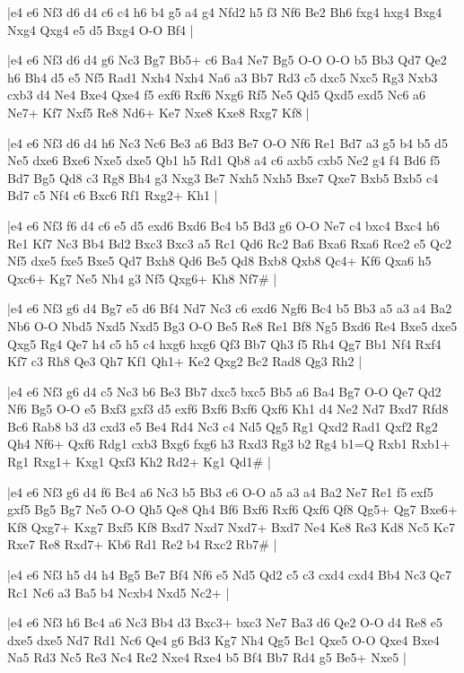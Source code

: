 \whitename{}
\blackname{}
\makegametitle
|e4 e6 Nf3 d6 d4 c6 c4 h6 b4 g5 a4 g4 Nfd2 h5 f3 Nf6 Be2 Bh6 fxg4 hxg4 Bxg4 Nxg4 Qxg4 e5 d5 Bxg4 O-O Bf4  |

\whitename{}
\blackname{}
\makegametitle
|e4 e6 Nf3 d6 d4 g6 Nc3 Bg7 Bb5+ c6 Ba4 Ne7 Bg5 O-O O-O b5 Bb3 Qd7 Qe2 h6 Bh4 d5 e5 Nf5 Rad1 Nxh4 Nxh4 Na6 a3 Bb7 Rd3 c5 dxc5 Nxc5 Rg3 Nxb3 cxb3 d4 Ne4 Bxe4 Qxe4 f5 exf6 Rxf6 Nxg6 Rf5 Ne5 Qd5 Qxd5 exd5 Nc6 a6 Ne7+ Kf7 Nxf5 Re8 Nd6+ Ke7 Nxe8 Kxe8 Rxg7 Kf8  |

\whitename{}
\blackname{}
\makegametitle
|e4 e6 Nf3 d6 d4 h6 Nc3 Nc6 Be3 a6 Bd3 Be7 O-O Nf6 Re1 Bd7 a3 g5 b4 b5 d5 Ne5 dxe6 Bxe6 Nxe5 dxe5 Qb1 h5 Rd1 Qb8 a4 c6 axb5 cxb5 Ne2 g4 f4 Bd6 f5 Bd7 Bg5 Qd8 c3 Rg8 Bh4 g3 Nxg3 Be7 Nxh5 Nxh5 Bxe7 Qxe7 Bxb5 Bxb5 c4 Bd7 c5 Nf4 c6 Bxc6 Rf1 Rxg2+ Kh1  |

\whitename{}
\blackname{}
\makegametitle
|e4 e6 Nf3 f6 d4 c6 e5 d5 exd6 Bxd6 Bc4 b5 Bd3 g6 O-O Ne7 c4 bxc4 Bxc4 h6 Re1 Kf7 Nc3 Bb4 Bd2 Bxc3 Bxc3 a5 Rc1 Qd6 Rc2 Ba6 Bxa6 Rxa6 Rce2 e5 Qc2 Nf5 dxe5 fxe5 Bxe5 Qd7 Bxh8 Qd6 Be5 Qd8 Bxb8 Qxb8 Qc4+ Kf6 Qxa6 h5 Qxc6+ Kg7 Ne5 Nh4 g3 Nf5 Qxg6+ Kh8 Nf7\#  |

\whitename{}
\blackname{}
\makegametitle
|e4 e6 Nf3 g6 d4 Bg7 e5 d6 Bf4 Nd7 Nc3 c6 exd6 Ngf6 Bc4 b5 Bb3 a5 a3 a4 Ba2 Nb6 O-O Nbd5 Nxd5 Nxd5 Bg3 O-O Be5 Re8 Re1 Bf8 Ng5 Bxd6 Re4 Bxe5 dxe5 Qxg5 Rg4 Qe7 h4 c5 h5 c4 hxg6 hxg6 Qf3 Bb7 Qh3 f5 Rh4 Qg7 Bb1 Nf4 Rxf4 Kf7 c3 Rh8 Qe3 Qh7 Kf1 Qh1+ Ke2 Qxg2 Bc2 Rad8 Qg3 Rh2  |

\whitename{}
\blackname{}
\makegametitle
|e4 e6 Nf3 g6 d4 c5 Nc3 b6 Be3 Bb7 dxc5 bxc5 Bb5 a6 Ba4 Bg7 O-O Qe7 Qd2 Nf6 Bg5 O-O e5 Bxf3 gxf3 d5 exf6 Bxf6 Bxf6 Qxf6 Kh1 d4 Ne2 Nd7 Bxd7 Rfd8 Bc6 Rab8 b3 d3 cxd3 e5 Be4 Rd4 Nc3 c4 Nd5 Qg5 Rg1 Qxd2 Rad1 Qxf2 Rg2 Qh4 Nf6+ Qxf6 Rdg1 cxb3 Bxg6 fxg6 h3 Rxd3 Rg3 b2 Rg4 b1=Q Rxb1 Rxb1+ Rg1 Rxg1+ Kxg1 Qxf3 Kh2 Rd2+ Kg1 Qd1\#  |

\whitename{}
\blackname{}
\makegametitle
|e4 e6 Nf3 g6 d4 f6 Bc4 a6 Nc3 b5 Bb3 c6 O-O a5 a3 a4 Ba2 Ne7 Re1 f5 exf5 gxf5 Bg5 Bg7 Ne5 O-O Qh5 Qe8 Qh4 Bf6 Bxf6 Rxf6 Qxf6 Qf8 Qg5+ Qg7 Bxe6+ Kf8 Qxg7+ Kxg7 Bxf5 Kf8 Bxd7 Nxd7 Nxd7+ Bxd7 Ne4 Ke8 Re3 Kd8 Nc5 Kc7 Rxe7 Re8 Rxd7+ Kb6 Rd1 Re2 b4 Rxc2 Rb7\#  |

\whitename{}
\blackname{}
\makegametitle
|e4 e6 Nf3 h5 d4 h4 Bg5 Be7 Bf4 Nf6 e5 Nd5 Qd2 c5 c3 cxd4 cxd4 Bb4 Nc3 Qc7 Rc1 Nc6 a3 Ba5 b4 Ncxb4 Nxd5 Nc2+  |

\whitename{}
\blackname{}
\makegametitle
|e4 e6 Nf3 h6 Bc4 a6 Nc3 Bb4 d3 Bxc3+ bxc3 Ne7 Ba3 d6 Qe2 O-O d4 Re8 e5 dxe5 dxe5 Nd7 Rd1 Nc6 Qe4 g6 Bd3 Kg7 Nh4 Qg5 Bc1 Qxe5 O-O Qxe4 Bxe4 Na5 Rd3 Nc5 Re3 Nc4 Re2 Nxe4 Rxe4 b5 Bf4 Bb7 Rd4 g5 Be5+ Nxe5  |

